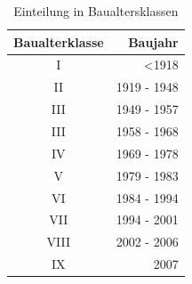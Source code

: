 \begin{table}[htb]
\centering
\caption{Einteilung in Baualtersklassen}\vspace{6pt}
\label{fig:PCM_Slurry1}
\begin{tabular}{cr} 
\hline
\textbf{Baualterklasse} & \textbf{Baujahr}\\
\hline 
I & <1918 \\  
II & 1919 - 1948 \\
III & 1949 - 1957 \\
III & 1958 - 1968 \\
IV & 1969 - 1978 \\
V &  1979 - 1983\\
VI & 1984 - 1994\\
VII & 1994 - 2001\\
VIII & 2002 - 2006\\
IX & 2007 \\
\hline 
\end{tabular}
\label{tab:Tabelle}
\end{table}


